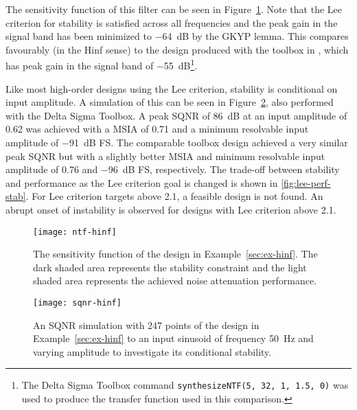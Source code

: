 The sensitivity function of this filter can be seen in Figure~\ref{fig:ntf-hinf}. Note that the Lee criterion for stability is satisfied across all frequencies and the peak gain in the signal band has been minimized to \SI{-64}{\deci\bel} by the \gls{GKYP} lemma. This compares favourably (in the \gls{Hinf} sense) to the design produced with the toolbox in \cite[Appx. B]{Schreier1997}, which has peak gain in the signal band of \SI{-55}{\deci\bel}\footnote{The Delta Sigma Toolbox command \texttt{synthesizeNTF(5,~32,~1,~1.5,~0)} was used to produce the transfer function used in this comparison.}.

Like most high-order designs using the Lee criterion, stability is conditional on input amplitude. A simulation of this can be seen in Figure~\ref{fig:sqnr-hinf}, also performed with the Delta Sigma Toolbox. A peak \gls{SQNR} of \SI{86}{\deci\bel} at an input amplitude of 0.62 was achieved with a \gls{MSIA} of 0.71 and a minimum resolvable input amplitude of \SI{-91}{\deci\bel} \gls{FS}. The comparable toolbox design achieved a very similar peak \gls{SQNR} but with a slightly better \gls{MSIA} and minimum resolvable input amplitude of 0.76 and \SI{-96}{\deci\bel} \gls{FS}, respectively. The trade-off between stability and performance as the Lee criterion goal is changed is shown in \autoref{fig:lee-perf-stab}. For Lee criterion targets above 2.1, a feasible design is not found. An abrupt onset of instability is observed for designs with Lee criterion above 2.1.

\begin{figure}
	\texttt{[image: ntf-hinf]}
	\centering
	\caption{The sensitivity function of the design in Example~\ref{sec:ex-hinf}. The dark shaded area represents the stability constraint and the light shaded area represents the achieved noise attenuation performance.} \label{fig:ntf-hinf}
\end{figure}

\begin{figure}
	\texttt{[image: sqnr-hinf]}
	\centering
	\caption{An SQNR simulation with 247 points of the design in Example~\ref{sec:ex-hinf} to an input sinusoid of frequency \SI{50}{\hertz} and varying amplitude to investigate its conditional stability.} \label{fig:sqnr-hinf}
\end{figure}

